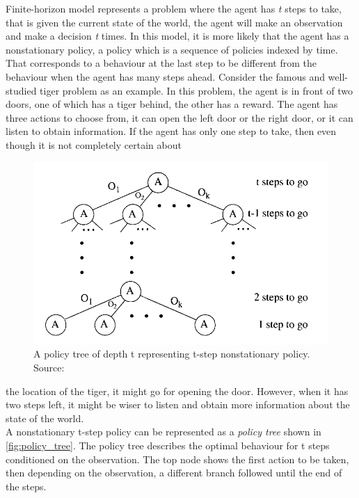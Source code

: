 Finite-horizon model represents a problem where the agent has \textit{t} steps to take, that is given the current state of the world, the agent will make an observation and make a decision \textit{t} times. In this model, it is more likely that the agent has a nonstationary policy, a policy which is a sequence of policies indexed by time. That corresponds to a behaviour at the last step to be different from the behaviour when the agent has many steps ahead. Consider the famous and well-studied tiger problem as an example. In this problem, the agent is in front of two doors, one of which has a tiger behind, the other has a reward. The agent has three actions to choose from, it can open the left door or the right door, or it can listen to obtain information. If the agent has only one step to take, then even though it is not completely certain about
\begin{figure}
	\begin{center}
		\includegraphics[width=1\linewidth]{figures/policy_tree}
		\caption[A policy tree]{A policy tree of depth t representing t-step nonstationary policy. Source: \cite{KAELBLING199899}}
		\label{fig:policy_tree}
	\end{center}
	\vspace{-55pt}
\end{figure} 
the location of the tiger, it might go for opening the door. However, when it has two steps left, it might be wiser to listen and obtain more information about the state of the world.\\
A nonstationary t-step policy can be represented as a \textit{policy tree} shown in \autoref{fig:policy_tree}. The policy tree describes the optimal behaviour for t steps conditioned on the observation. The top node shows the first action to be taken, then depending on the observation, a different branch followed until the end of the steps. \\
